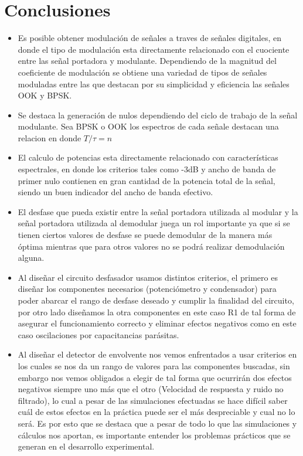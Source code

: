 \documentclass[letterpaper, titlepage]{article}
\begin{document}
\section{Conclusiones}
	\begin{itemize}
		\item Es posible obtener modulación de señales a traves de señales digitales, en donde el tipo de modulación esta directamente relacionado con el cuociente entre las señal portadora y modulante. Dependiendo de la magnitud del coeficiente de modulación se obtiene una variedad de tipos de señales moduladas entre las que destacan por su simplicidad y eficiencia las señales OOK y BPSK.
		\item Se destaca la generación de nulos dependiendo del ciclo de trabajo de la señal modulante. Sea BPSK o OOK los espectros de cada señale destacan una relacion en donde $T/\tau=n$
		\item El calculo de potencias esta directamente relacionado con características espectrales, en donde los criterios tales como -3dB y ancho de banda de primer nulo contienen en gran cantidad de la potencia total de la señal, siendo un buen indicador del ancho de banda efectivo.
		\item El desfase que pueda existir entre la señal portadora utilizada al modular y la señal portadora utilizada al demodular juega un rol importante ya que si se tienen ciertos valores de desfase se puede demodular de la manera más óptima mientras que para otros valores no se podrá realizar demodulación alguna.
		\item Al diseñar el circuito desfasador usamos distintos criterios, el primero es diseñar los componentes necesarios (potenciómetro y condensador) para poder abarcar el rango de desfase deseado  y cumplir la finalidad del circuito, por otro lado diseñamos la otra componentes en este caso R1 de tal forma de asegurar el funcionamiento correcto y eliminar efectos negativos como en este caso oscilaciones por capacitancias parásitas.
		\item Al diseñar el detector de envolvente nos vemos enfrentados a usar criterios en los cuales se nos da un rango de valores para las componentes buscadas, sin embargo  nos vemos obligados a elegir de tal forma que ocurrirán dos efectos negativos siempre uno más que el otro (Velocidad de respuesta y ruido no filtrado), lo cual a pesar de las simulaciones efectuadas se hace difícil saber cuál de estos efectos en la práctica puede ser el más despreciable y cual no lo será. Es por esto que se destaca que a pesar de todo lo que las simulaciones y cálculos nos aportan, es importante entender los problemas prácticos que se generan en el desarrollo experimental.
	\end{itemize}
\end{document}
